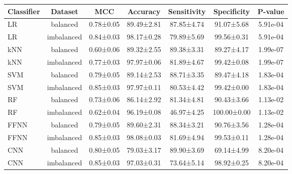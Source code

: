 \begin{tabular}{lcccccc}
\toprule
Classifier &    Dataset &       MCC &   Accuracy & Sensitivity & Specificity &  P-value \\
\midrule
        LR &   balanced & 0.78±0.05 & 89.49±2.81 &  87.85±4.74 &  91.07±5.68 & 5.91e-04 \\
        LR & imbalanced & 0.84±0.03 & 98.17±0.28 &  79.89±5.69 &  99.56±0.31 & 5.91e-04 \\
       kNN &   balanced & 0.60±0.06 & 89.32±2.55 &  89.38±3.31 &  89.27±4.17 & 1.99e-07 \\
       kNN & imbalanced & 0.77±0.03 & 97.97±0.06 &  81.89±4.67 &  99.42±0.08 & 1.99e-07 \\
       SVM &   balanced & 0.79±0.05 & 89.14±2.53 &  88.71±3.35 &  89.47±4.18 & 1.83e-04 \\
       SVM & imbalanced & 0.85±0.03 & 97.97±0.11 &  80.53±4.42 &  99.42±0.00 & 1.83e-04 \\
        RF &   balanced & 0.73±0.06 & 86.14±2.92 &  81.34±4.81 &  90.43±3.66 & 1.13e-02 \\
        RF & imbalanced & 0.62±0.04 & 96.19±0.08 &  46.97±4.25 & 100.00±0.00 & 1.13e-02 \\
      FFNN &   balanced & 0.79±0.05 & 89.60±2.31 &  88.34±3.21 &  90.76±3.56 & 1.28e-04 \\
      FFNN & imbalanced & 0.85±0.03 & 98.08±0.03 &  81.69±4.94 &  99.53±0.11 & 1.28e-04 \\
       CNN &   balanced & 0.80±0.05 & 79.03±3.17 &  89.90±3.69 &  69.14±4.99 & 8.20e-04 \\
       CNN & imbalanced & 0.85±0.03 & 97.03±0.31 &  73.64±5.14 &  98.92±0.25 & 8.20e-04 \\
\bottomrule
\end{tabular}
